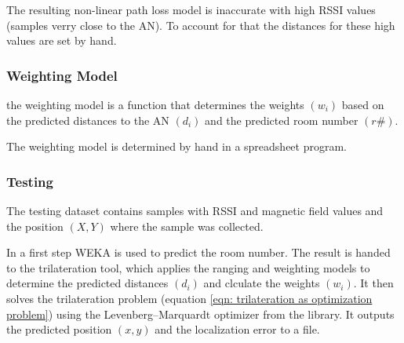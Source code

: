 The resulting non-linear path loss model is inaccurate with high RSSI values (samples verry close to the AN). To account for that the distances for these high values are set by hand.

\subsubsection*{Weighting Model}

the weighting model is a function that determines the weights \((w_{i})\) based on the predicted distances to the AN \((d_{i})\) and the predicted room number \((r\#)\).

The weighting model is determined by hand in a spreadsheet program. 

\subsubsection*{Testing}

The testing dataset contains samples with RSSI and magnetic field values and the position \((X,Y)\) where the sample was collected.

In a first step WEKA is used to predict the room number. The result is handed to the trilateration tool, which applies the ranging and weighting models to determine the predicted distances \((d_{i})\) and clculate the weights \((w_{i})\). It then solves the trilateration problem (equation \ref{eqn: trilateration as optimization problem}) using the Levenberg–Marquardt optimizer from the  library. It outputs the predicted position \((x,y)\) and the localization error to a  file.